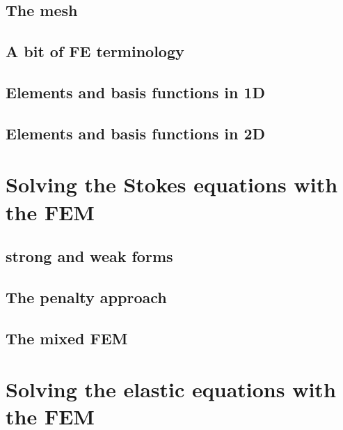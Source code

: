 \documentclass[a4paper]{article}
\begin{document}
\subsection{The mesh}

\subsection{A bit of FE terminology}  %

\subsection{Elements and basis functions in 1D}  %

\subsection{Elements and basis functions in 2D}  %

\newpage 
\section{Solving the Stokes equations with the FEM} %

\subsection{strong and weak forms}  %

\subsection{The penalty approach}  %

\subsection{The mixed FEM}  %



\newpage
\section{Solving the elastic equations with the FEM}
\end{document}
